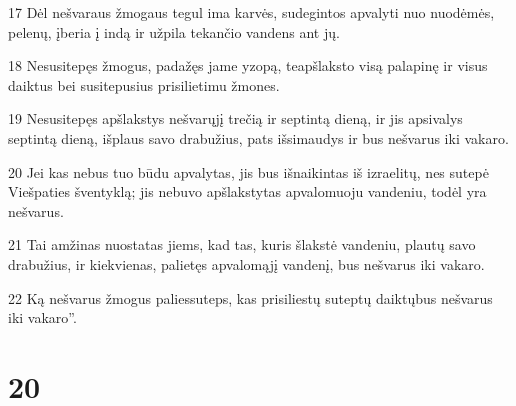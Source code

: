 \par 17 Dėl nešvaraus žmogaus tegul ima karvės, sudegintos apvalyti nuo nuodėmės, pelenų, įberia į indą ir užpila tekančio vandens ant jų. 
\par 18 Nesusitepęs žmogus, padažęs jame yzopą, teapšlaksto visą palapinę ir visus daiktus bei susitepusius prisilietimu žmones. 
\par 19 Nesusitepęs apšlakstys nešvarųjį trečią ir septintą dieną, ir jis apsivalys septintą dieną, išplaus savo drabužius, pats išsimaudys ir bus nešvarus iki vakaro. 
\par 20 Jei kas nebus tuo būdu apvalytas, jis bus išnaikintas iš izraelitų, nes sutepė Viešpaties šventyklą; jis nebuvo apšlakstytas apvalomuoju vandeniu, todėl yra nešvarus. 
\par 21 Tai amžinas nuostatas jiems, kad tas, kuris šlakstė vandeniu, plautų savo drabužius, ir kiekvienas, palietęs apvalomąjį vandenį, bus nešvarus iki vakaro. 
\par 22 Ką nešvarus žmogus palies­suteps, kas prisiliestų suteptų daiktų­bus nešvarus iki vakaro”.



\chapter{20}

